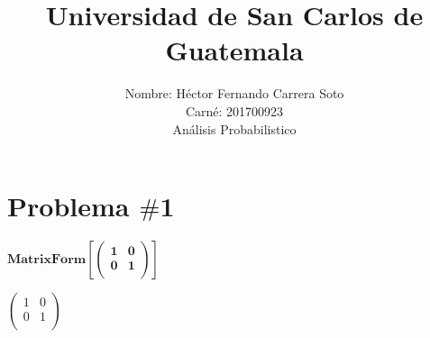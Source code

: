 \documentclass{article}
\begin{document}
\title{Universidad de San Carlos de Guatemala}
\author{Nombre: Héctor Fernando Carrera Soto\\
Carné: 201700923\\
Análisis Probabilistico}
\date{}
\maketitle

\section*{Problema $\#$1}

\begin{doublespace}
\noindent\(\pmb{\text{MatrixForm}\left[\left(
\begin{array}{cc}
 1 & 0 \\
 0 & 1 \\
\end{array}
\right)\right]}\)
\end{doublespace}

\begin{doublespace}
\noindent\(\left(
\begin{array}{cc}
 1 & 0 \\
 0 & 1 \\
\end{array}
\right)\)
\end{doublespace}
\end{document}
